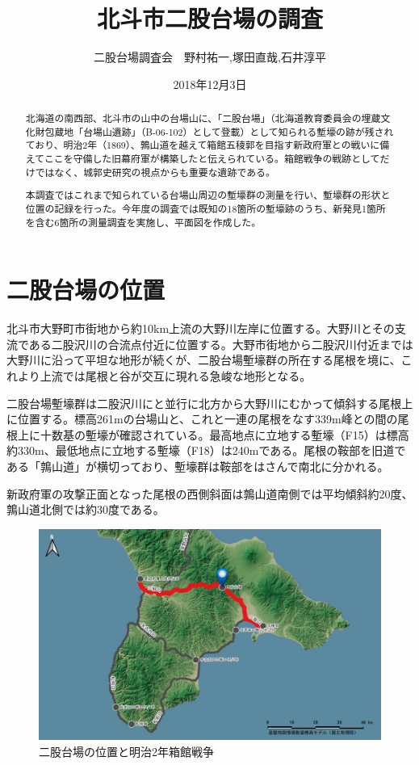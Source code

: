 \documentclass[14Q]{jsarticle}
\title{北斗市二股台場の調査}%
\date{2018年12月3日}
\author{二股台場調査会　野村祐一,塚田直哉,石井淳平}              %
\begin{document}
\maketitle
\begin{abstract}
北海道の南西部、北斗市の山中の台場山に、「二股台場」（北海道教育委員会の埋蔵文化財包蔵地「台場山遺跡」（B-06-102）として登載）として知られる塹壕の跡が残されており、明治2年（1869）、鶉山道を越えて箱館五稜郭を目指す新政府軍との戦いに備えてここを守備した旧幕府軍が構築したと伝えられている。箱館戦争の戦跡としてだけではなく、城郭史研究の視点からも重要な遺跡である。

本調査ではこれまで知られている台場山周辺の塹壕群の測量を行い、塹壕群の形状と位置の記録を行った。今年度の調査では既知の18箇所の塹壕跡のうち、新発見1箇所を含む6箇所の測量調査を実施し、平面図を作成した。
\end{abstract}

\section{二股台場の位置}
北斗市大野町市街地から約10km上流の大野川左岸に位置する。大野川とその支流である二股沢川の合流点付近に位置する。大野市街地から二股沢川付近までは大野川に沿って平坦な地形が続くが、二股台場塹壕群の所在する尾根を境に、これより上流では尾根と谷が交互に現れる急峻な地形となる。

二股台場塹壕群は二股沢川にと並行に北方から大野川にむかって傾斜する尾根上に位置する。標高261mの台場山と、これと一連の尾根をなす339m峰との間の尾根上に十数基の塹壕が確認されている。最高地点に立地する塹壕（F15）は標高約330m、最低地点に立地する塹壕（F18）は240mである。尾根の鞍部を旧道である「鶉山道」が横切っており、塹壕群は鞍部をはさんで南北に分かれる。

新政府軍の攻撃正面となった尾根の西側斜面は鶉山道南側では平均傾斜約20度、鶉山道北側では約30度である。

\begin{figure}[h]
\centering
\includegraphics[width=160truemm]{fig/dounan.pdf}
\caption{二股台場の位置と明治2年箱館戦争}
\end{figure}
\end{document}
